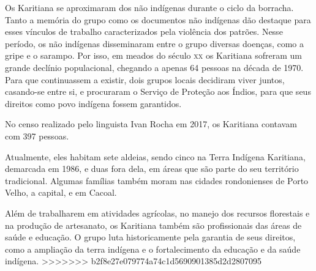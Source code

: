 Os Karitiana se aproximaram dos não indígenas durante o ciclo da
borracha. Tanto a memória do grupo como os documentos não indígenas dão
destaque para esses vínculos de trabalho caracterizados pela violência
dos patrões. Nesse período, os não indígenas disseminaram entre o grupo
diversas doenças, como a gripe e o sarampo. Por isso, em meados do
século \textsc{xx} os Karitiana sofreram um grande declínio populacional,
chegando a apenas 64 pessoas na década de 1970. Para que continuassem a
existir, dois grupos locais decidiram viver juntos, casando-se entre si,
e procuraram o Serviço de Proteção aos Índios, para que seus direitos
como povo indígena fossem garantidos.

No censo realizado pelo linguista Ivan Rocha em 2017, os Karitiana
contavam com 397 pessoas.

Atualmente, eles habitam sete aldeias, sendo cinco na Terra Indígena
Karitiana, demarcada em 1986, e duas fora dela, em áreas que são parte
do seu território tradicional. Algumas famílias também moram nas cidades
rondonienses de Porto Velho, a capital, e em Cacoal.

Além de trabalharem em atividades agrícolas, no manejo dos recursos
florestais e na produção de artesanato, os Karitiana também são
profissionais das áreas de saúde e educação. O grupo luta historicamente
pela garantia de seus direitos, como a ampliação da terra indígena e o
fortalecimento da educação e da saúde indígena.
>>>>>>> b2f8e27e079774a74c1d5690901385d2d2807095



